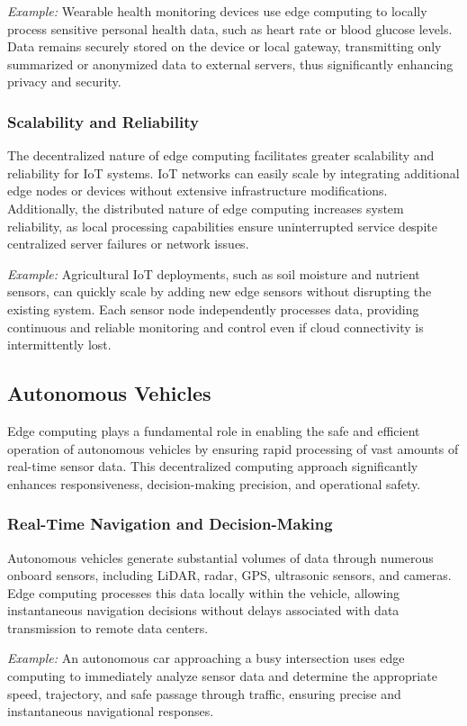 \documentclass[runningheads]{llncs}
\begin{document}
\noindent\textit{Example:} Wearable health monitoring devices use edge computing to locally process sensitive personal health data, such as heart rate or blood glucose levels. Data remains securely stored on the device or local gateway, transmitting only summarized or anonymized data to external servers, thus significantly enhancing privacy and security.

\subsubsection{Scalability and Reliability}
The decentralized nature of edge computing facilitates greater scalability and reliability for IoT systems. IoT networks can easily scale by integrating additional edge nodes or devices without extensive infrastructure modifications. Additionally, the distributed nature of edge computing increases system reliability, as local processing capabilities ensure uninterrupted service despite centralized server failures or network issues.

\noindent\textit{Example:} Agricultural IoT deployments, such as soil moisture and nutrient sensors, can quickly scale by adding new edge sensors without disrupting the existing system. Each sensor node independently processes data, providing continuous and reliable monitoring and control even if cloud connectivity is intermittently lost.
\subsection{Autonomous Vehicles}

Edge computing plays a fundamental role in enabling the safe and efficient operation of autonomous vehicles by ensuring rapid processing of vast amounts of real-time sensor data. This decentralized computing approach significantly enhances responsiveness, decision-making precision, and operational safety.

\subsubsection{Real-Time Navigation and Decision-Making}
Autonomous vehicles generate substantial volumes of data through numerous onboard sensors, including LiDAR, radar, GPS, ultrasonic sensors, and cameras. Edge computing processes this data locally within the vehicle, allowing instantaneous navigation decisions without delays associated with data transmission to remote data centers.

\noindent\textit{Example:} An autonomous car approaching a busy intersection uses edge computing to immediately analyze sensor data and determine the appropriate speed, trajectory, and safe passage through traffic, ensuring precise and instantaneous navigational responses.
\end{document}
